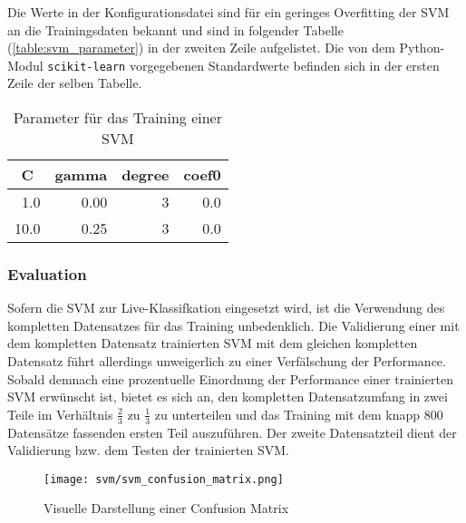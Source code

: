 Die Werte in der Konfigurationsdatei sind für ein geringes Overfitting der \ac{SVM} an die Trainingsdaten bekannt und sind in folgender Tabelle (\autoref{table:svm_parameter}) in der zweiten Zeile aufgelistet.
Die von dem Python-Modul \texttt{scikit-learn} vorgegebenen Standardwerte befinden sich in der ersten Zeile der selben Tabelle.

\begin{table}[h]
\centering
\begin{tabular}{rrrr}
\hline
  \multicolumn{1}{c}{\textbf{C}} & \multicolumn{1}{c}{\textbf{gamma}} & \multicolumn{1}{c}{\textbf{degree}} & \multicolumn{1}{c}{\textbf{coef0}} \\
 \hline
 1.0 & 0.00 & 3 & 0.0 \\
 \hline
 10.0 & 0.25 & 3 & 0.0 \\
\hline
\end{tabular}
\caption[Parameter für das Training einer SVM]{Parameter für das Training einer SVM}
\label{tab:svm_parameter}
\end{table}


\subsubsection{Evaluation}\label{sec:svm_evaluation}
Sofern die \ac{SVM} zur Live-Klassifkation eingesetzt wird, ist die Verwendung des kompletten Datensatzes für das Training unbedenklich.
Die Validierung einer mit dem kompletten Datensatz trainierten \ac{SVM} mit dem gleichen kompletten Datensatz führt allerdings unweigerlich zu einer Verfälschung der Performance.
Sobald demnach eine prozentuelle Einordnung der Performance einer trainierten \ac{SVM} erwünscht ist, bietet es sich an, den kompletten Datensatzumfang in zwei Teile im Verhältnis $\frac{2}{3}$ zu $\frac{1}{3}$ zu unterteilen und das Training mit dem knapp 800 Datensätze fassenden ersten Teil auszuführen.
Der zweite Datensatzteil dient der Validierung bzw. dem Testen der trainierten \ac{SVM}.

\begin{figure}[htbp] \centering
    \texttt{[image: svm/svm\_confusion\_matrix.png]}
    \caption{Visuelle Darstellung einer Confusion Matrix}
    \label{fig:svm_confusion_matrix}
\end{figure}

